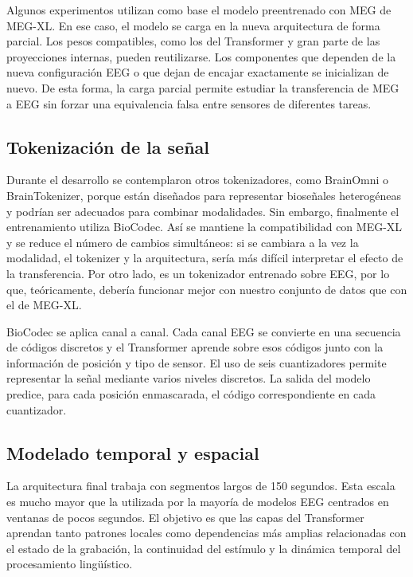 Algunos experimentos utilizan como base el modelo preentrenado con MEG de MEG-XL. En ese caso, el modelo se carga en la nueva arquitectura de forma parcial. Los pesos compatibles, como los del Transformer y gran parte de las proyecciones internas, pueden reutilizarse. Los componentes que dependen de la nueva configuración EEG o que dejan de encajar exactamente se inicializan de nuevo. De esta forma, la carga parcial permite estudiar la transferencia de MEG a EEG sin forzar una equivalencia falsa entre sensores de diferentes tareas.

\subsection{Tokenización de la señal}

Durante el desarrollo se contemplaron otros tokenizadores, como BrainOmni o BrainTokenizer, porque están diseñados para representar bioseñales heterogéneas y podrían ser adecuados para combinar modalidades. Sin embargo, finalmente el entrenamiento utiliza BioCodec. Así se mantiene la compatibilidad con MEG-XL y se reduce el número de cambios simultáneos: si se cambiara a la vez la modalidad, el tokenizer y la arquitectura, sería más difícil interpretar el efecto de la transferencia. Por otro lado, es un tokenizador entrenado sobre EEG, por lo que, teóricamente, debería funcionar mejor con nuestro conjunto de datos que con el de MEG-XL.

BioCodec se aplica canal a canal. Cada canal EEG se convierte en una secuencia de códigos discretos y el Transformer aprende sobre esos códigos junto con la información de posición y tipo de sensor. El uso de seis cuantizadores permite representar la señal mediante varios niveles discretos. La salida del modelo predice, para cada posición enmascarada, el código correspondiente en cada cuantizador.

\subsection{Modelado temporal y espacial}

La arquitectura final trabaja con segmentos largos de 150 segundos. Esta escala es mucho mayor que la utilizada por la mayoría de modelos EEG centrados en ventanas de pocos segundos. El objetivo es que las capas del Transformer aprendan tanto patrones locales como dependencias más amplias relacionadas con el estado de la grabación, la continuidad del estímulo y la dinámica temporal del procesamiento lingüístico.

